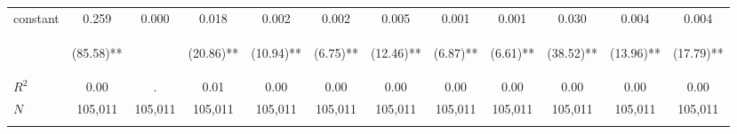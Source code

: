 \begin{tabular}{lccccccccccc}
\noalign{\smallskip}constant & 0.259 & 0.000 & 0.018 & 0.002 & 0.002 & 0.005 & 0.001 & 0.001 & 0.030 & 0.004 & 0.004\\
 & \begin{footnotesize}(85.58)**\end{footnotesize} & \begin{footnotesize}\end{footnotesize} & \begin{footnotesize}(20.86)**\end{footnotesize} & \begin{footnotesize}(10.94)**\end{footnotesize} & \begin{footnotesize}(6.75)**\end{footnotesize} & \begin{footnotesize}(12.46)**\end{footnotesize} & \begin{footnotesize}(6.87)**\end{footnotesize} & \begin{footnotesize}(6.61)**\end{footnotesize} & \begin{footnotesize}(38.52)**\end{footnotesize} & \begin{footnotesize}(13.96)**\end{footnotesize} & \begin{footnotesize}(17.79)**\end{footnotesize}\\
\noalign{\smallskip}$R^2$ & 0.00 & . & 0.01 & 0.00 & 0.00 & 0.00 & 0.00 & 0.00 & 0.00 & 0.00 & 0.00\\
$N$ & 105,011 & 105,011 & 105,011 & 105,011 & 105,011 & 105,011 & 105,011 & 105,011 & 105,011 & 105,011 & 105,011\\
\noalign{\smallskip}\hline\hline\end{tabular}
